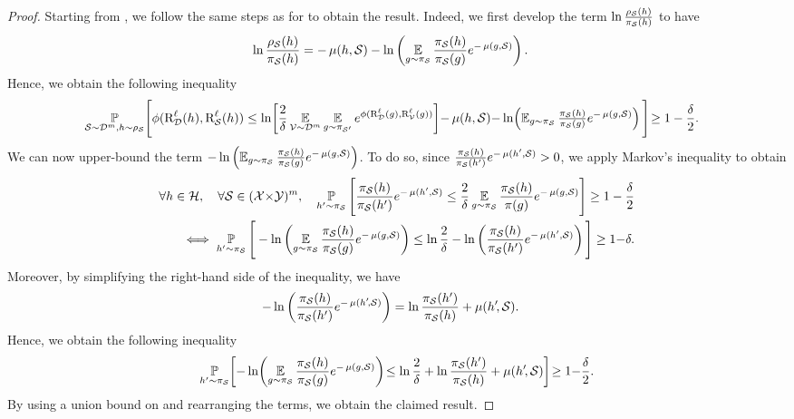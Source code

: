 \documentclass[twoside]{article}
\theoremstyle{plain}
\begin{document}
\begin{proof}
Starting from , we follow the same steps as for  to obtain the result.
Indeed, we first develop the term $\ln\frac{\rho_{\mathcal{S}}(h)}{\pi_{\mathcal{S}}(h)}$ to have 
\begin{align*} 
    \ln\frac{\rho_{\mathcal{S}}(h)}{\pi_{\mathcal{S}}(h)} &= -\operatorname{\mu}(h, \mathcal{S}) - \ln\left(\operatorname*{\mathbb{E}}_{g\sim\pi_{\mathcal{S}}} \frac{\pi_{\mathcal{S}}(h)}{\pi_{\mathcal{S}}(g)}e^{-\operatorname{\mu}(g, \mathcal{S})}\right).
\end{align*}
Hence, we obtain the following inequality
\begin{align}
    &\operatorname*{\mathbb{P}}_{\mathcal{S}\sim\mathcal{D}^m,h\sim\rho_{\mathcal{S}}}\!\Bigg[ \phi(\text{R}^{\ell}_{\mathcal{D}}(h), \text{R}^{\ell}_{\mathcal{S}}(h)) \le \ln\!\left[\frac{2}{\delta}\operatorname*{\mathbb{E}}_{\mathcal{V}\sim\mathcal{D}^m}\operatorname*{\mathbb{E}}_{g\sim\pi_{\mathcal{S}'}}e^{\phi(\text{R}^{\ell}_{\mathcal{D}}(g), \text{R}^{\ell}_{\mathcal{V}}(g))}\right]\!{-}\operatorname{\mu}(h, \mathcal{S}) {-}\ln\!\left({\textstyle\operatorname*{\mathbb{E}}_{g\sim\pi_{\mathcal{S}}} \frac{\pi_{\mathcal{S}}(h)}{\pi_{\mathcal{S}}(g)}}e^{-\operatorname{\mu}(g, \mathcal{S})}\right)\Bigg]\! \ge 1-\frac{\delta}{2}.\label{eq:proof-disintegrated-comp-1}
\end{align}
We can now upper-bound the term $-\ln\left({\textstyle\operatorname*{\mathbb{E}}_{g\sim\pi_{\mathcal{S}}} \frac{\pi_{\mathcal{S}}(h)}{\pi_{\mathcal{S}}(g)}}e^{-\operatorname{\mu}(g, \mathcal{S})}\right)$.
To do so, since $\frac{\pi_{\mathcal{S}}(h)}{\pi_{\mathcal{S}}(h')}e^{-\operatorname{\mu}(h', \mathcal{S})} > 0$, we apply Markov's inequality to obtain
\begin{align*}
    \forall h\in\mathcal{H},\quad \forall\mathcal{S}\in(\mathcal{X}{\times}\mathcal{Y})^{m},\quad \operatorname*{\mathbb{P}}_{h'\sim\pi_{\mathcal{S}}}\Bigg[\frac{\pi_{\mathcal{S}}(h)}{\pi_{\mathcal{S}}(h')}e^{-\operatorname{\mu}(h', \mathcal{S})} \le \frac{2}{\delta}\operatorname*{\mathbb{E}}_{g\sim\pi_{\mathcal{S}}}\frac{\pi_{\mathcal{S}}(h)}{\pi(g)}e^{-\operatorname{\mu}(g, \mathcal{S})}\Bigg]\ge 1-\frac{\delta}{2}&\\
    \iff  \operatorname*{\mathbb{P}}_{h'\sim\pi_{\mathcal{S}}}\Bigg[-\ln\left(\operatorname*{\mathbb{E}}_{g\sim\pi_{\mathcal{S}}}\frac{\pi_{\mathcal{S}}(h)}{\pi_{\mathcal{S}}(g)}e^{-\operatorname{\mu}(g, \mathcal{S})}\right) \le \ln\frac{2}{\delta} -\ln\left(\frac{\pi_{\mathcal{S}}(h)}{\pi_{\mathcal{S}}(h')}e^{-\operatorname{\mu}(h', \mathcal{S})}\right)\Bigg]\ge 1{-}\delta.&
\end{align*}
Moreover, by simplifying the right-hand side of the inequality, we have 
\begin{align*}
    -\ln\left(\frac{\pi_{\mathcal{S}}(h)}{\pi_{\mathcal{S}}(h')}e^{-\operatorname{\mu}(h'\!, \mathcal{S})}\right) &= \ln\frac{\pi_{\mathcal{S}}(h')}{\pi_{\mathcal{S}}(h)} +\operatorname{\mu}(h'\!, \mathcal{S}).
\end{align*}
Hence, we obtain the following inequality
\begin{align}
    \operatorname*{\mathbb{P}}_{h'\sim\pi_{\mathcal{S}}}\!\left[ -\ln\!\left(\operatorname*{\mathbb{E}}_{g\sim\pi_{\mathcal{S}}}\frac{\pi_{\mathcal{S}}(h)}{\pi_{\mathcal{S}}(g)}e^{-\operatorname{\mu}(g, \mathcal{S})}\right) \!\le \ln\frac{2}{\delta}+\ln\frac{\pi_{\mathcal{S}}(h')}{\pi_{\mathcal{S}}(h)} +\operatorname{\mu}(h'\!, \mathcal{S}) \right]\! \ge 1{-}\frac{\delta}{2}.\label{eq:proof-disintegrated-comp-2}
\end{align}
By using a union bound on  and rearranging the terms, we obtain the claimed result.
\end{proof}
\end{document}
